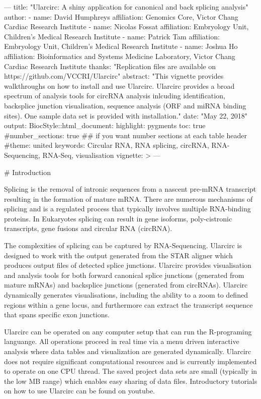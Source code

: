 ---
title: "Ularcirc: A shiny application for canonical and back splicing analysis"
author: 
  - name: David Humphreys
    affiliation: Genomics Core, Victor Chang Cardiac Research Institute
  - name: Nicolas Fossat
    affiliation: Embryology Unit, Children's Medical Research Institute
  - name: Patrick Tam
    affiliation: Embryology Unit, Children's Medical Research Institute
  - name: Joshua Ho
    affiliation: Bioinformatics and Systems Medicine Laboratory, Victor Chang Cardiac Research Institute
thanks: "Replication files are available on https://github.com/VCCRI/Ularcirc"
abstract: "This vignette provides walkthroughs on how to install and use Ularcirc. Ularcirc provides a broad spectrum of analysis tools for circRNA analysis inlcuding  identification, backsplice junction visualisation, sequence analysis (ORF and miRNA binding sites). One sample data set is provided with installation."
date: "May 22, 2018"
output: 
    BiocStyle::html_document:
    highlight: pygments
    toc: true
    #number_sections: true  ## if you want number sections at each table header
    #theme: united 
keywords: Circular RNA, RNA splicing, circRNA, RNA-Sequencing, RNA-Seq, visualisation
vignette: >
---






# Introduction

Splicing is the removal of intronic sequences from a nascent pre-mRNA transcript resulting in the formation of mature mRNA. There are numerous mechanisms of splicing and is a regulated process that typically involves multiple RNA-binding proteins. In Eukaryotes splicing can result in gene isoforms, poly-cistronic transcripts, gene fusions and circular RNA (circRNA).

 The complexities of splicing  can be captured by RNA-Sequencing. Ularcirc is designed to work with the output generated from the STAR aligner which produces output files of detected splice junctions. Ularcirc provides visualisation and analysis tools for both forward canonical splice junctions (generated from mature mRNAs) and backsplice junctions (generated from circRNAs). Ularcirc dynamically generates visualisations, including the ability to a zoom to defined regions within a gene locus, and furthermore can extract the transcript sequence that spans specific exon junctions.
 
 Ularcirc can be operated on any computer setup that can run the R-programing languange. All operations proceed in real time via a menu driven interactive analysis where data tables and visualization are generated dynamically. Ularcirc does not require significant computational resources and is currently implemented to operate on one CPU thread. The saved project data sets are small (typically in the low MB range) which enables easy sharing of data files. Introductory tutorials on how to use Ularcirc can be found on youtube. 
 
